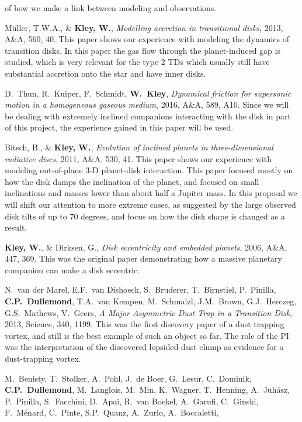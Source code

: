 \documentclass[10pt,fleqn,twoside]{article}
\begin{document}
\begin{literature}
  of how we make a link between modeling and observations.
\item M\"uller, T.W.A., \& {\bf Kley, W.}, {\em Modelling accretion in
    transitional disks}, 2013, A\&A, 560, 40.  This paper shows our
  experience with modeling the dynamics of transition disks. In this paper
  the gas flow through the planet-induced gap is studied, which is very
  relevant for the type 2 TDs which usually still have substantial accretion
  onto the star and have inner disks. 
\item D.~Thun, R.~Kuiper, F.~Schmidt, {\bf W.~Kley}, {\em Dynamical friction
    for supersonic motion in a homogeneous gaseous medium}, 2016, A\&A, 589,
  A10. Since we will be dealing with extremely inclined companions
  interacting with the disk in part of this project, the experience gained
  in this paper will be used.
\item Bitsch, B., \& {\bf Kley, W.}, {\em Evolution of inclined planets in
    three-dimensional radiative discs}, 2011, A\&A, 530, 41. This paper
  shows our experience with modeling out-of-plane 3-D planet-disk
  interaction. This paper focused mostly on how the disk damps the
  inclination of the planet, and focused on small inclinations and masses
  lower than about half a Jupiter mass. In this proposal we will shift our
  attention to more extreme cases, as suggested by the large observed disk
  tilts of up to 70 degrees, and focus on how the disk shape is changed as
  a result. 
\item {\bf Kley, W.}, \& Dirksen, G., {\em Disk eccentricity and embedded
    planets}, 2006, A\&A, 447, 369. This was the original paper
  demonstrating how a massive planetary companion can make a disk eccentric.
\item N.~van der Marel, E.F.~van Dishoeck, S.~Bruderer, T.~Birnstiel,
  P.~Pinilla, {\bf C.P.~Dullemond}, T.A.~van Kempen, M.~Schmalzl,
  J.M.~Brown, G.J.~Herczeg, G.S.~Mathews, V.~Geers, {\em A Major Asymmetric
    Dust Trap in a Transition Disk}, 2013, Science, 340, 1199. This was the
  first discovery paper of a dust trapping vortex, and still is the best
  example of such an object so far. The role of the PI was the
  interpretation of the discovered lopsided dust clump as evidence for a
  dust-trapping vortex.
\item M.~Benisty, T.~Stolker, A.~Pohl, J.~de Boer, G.~Lesur, C.~Dominik,
  {\bf C.P.~Dullemond}, M.~Langlois, M.~Min, K.~Wagner, T.~Henning,
  A.~Juh{\'a}sz, P.~Pinilla, S.~Facchini, D.~Apai, R.~van Boekel, A.~Garufi,
  C.~Ginski, F.~M{\'e}nard, C.~Pinte, S.P.~Quanz, A.~Zurlo, A.~Boccaletti,

\end{literature}
\end{document}
